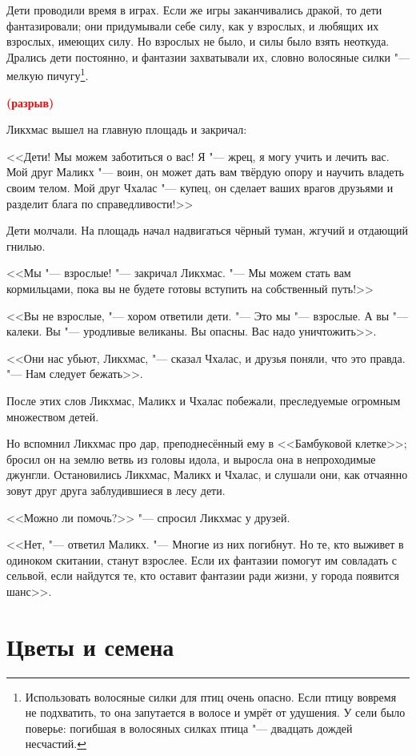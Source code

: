 \documentclass[a4paper,10pt]{book}
\newcommand{\spacing}{\textcolor{red}{\textbf{(разрыв)}}}
\begin{document}
Дети проводили время в играх. Если же игры заканчивались дракой, то дети фантазировали; они придумывали себе силу, как у взрослых, и любящих их взрослых, имеющих силу. Но взрослых не было, и силы было взять неоткуда. Дрались дети постоянно, и фантазии захватывали их, словно волосяные силки "--- мелкую пичугу\footnote{Использовать волосяные силки для птиц очень опасно. Если птицу вовремя не подхватить, то она запутается в волосе и умрёт от удушения. У сели было поверье: погибшая в волосяных силках птица "--- двадцать дождей несчастий.}.

\spacing

Ликхмас вышел на главную площадь и закричал:

<<Дети! Мы можем заботиться о вас! Я "--- жрец, я могу учить и лечить вас. Мой друг Маликх "--- воин, он может дать вам твёрдую опору и научить владеть своим телом. Мой друг Чхалас "--- купец, он сделает ваших врагов друзьями и разделит блага по справедливости!>>

Дети молчали. На площадь начал надвигаться чёрный туман, жгучий и отдающий гнилью.

<<Мы "--- взрослые! "--- закричал Ликхмас. "--- Мы можем стать вам кормильцами, пока вы не будете готовы вступить на собственный путь!>>

<<Вы не взрослые, "--- хором ответили дети. "--- Это мы "--- взрослые. А вы "--- калеки. Вы "--- уродливые великаны. Вы опасны. Вас надо уничтожить>>.

<<Они нас убьют, Ликхмас, "--- сказал Чхалас, и друзья поняли, что это правда. "--- Нам следует бежать>>.

После этих слов Ликхмас, Маликх и Чхалас побежали, преследуемые огромным множеством детей.

Но вспомнил Ликхмас про дар, преподнесённый ему в <<Бамбуковой клетке>>; бросил он на землю ветвь из головы идола, и выросла она в непроходимые джунгли. Остановились Ликхмас, Маликх и Чхалас, и слушали они, как отчаянно зовут друг друга заблудившиеся в лесу дети.

<<Можно ли помочь?>> "--- спросил Ликхмас у друзей.

<<Нет, "--- ответил Маликх. "--- Многие из них погибнут. Но те, кто выживет в одиноком скитании, станут взрослее. Если их фантазии помогут им совладать с сельвой, если найдутся те, кто оставит фантазии ради жизни, у города появится шанс>>.

\section{Цветы и семена}
\end{document}
